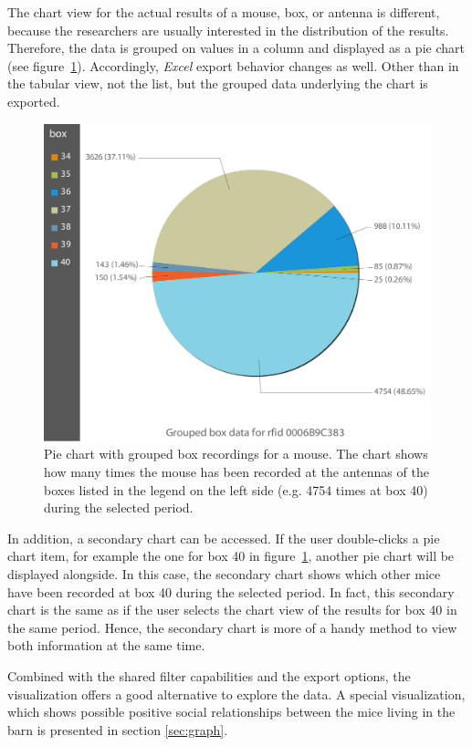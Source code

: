 The chart view for the actual results of a mouse, box, or antenna is different, because the researchers are usually interested in the distribution of the results. Therefore, the data is grouped on values in a column and displayed as a pie chart (see figure~\ref{fig:pie_chart_for_mouse}). Accordingly, \textit{Excel} export behavior changes as well. Other than in the tabular view, not the list, but the grouped data underlying the chart is exported.

\begin{figure}[htbp]
\begin{center}
  \includegraphics[width=.66\textwidth]{assets/img/pie_chart_for_mouse.png}
  \caption[Pie chart of result data for a mouse]{Pie chart with grouped box recordings for a mouse. The chart shows how many times the mouse has been recorded at the antennas of the boxes listed in the legend on the left side (e.g. 4754 times at box 40) during the selected period.}
  \label{fig:pie_chart_for_mouse}
\end{center}
\end{figure}

In addition, a secondary chart can be accessed. If the user double-clicks a pie chart item, for example the one for box 40 in figure~\ref{fig:pie_chart_for_mouse}, another pie chart will be displayed alongside. In this case, the secondary chart shows which other mice have been recorded at box 40 during the selected period. In fact, this secondary chart is the same as if the user selects the chart view of the results for box 40 in the same period. Hence, the secondary chart is more of a handy method to view both information at the same time.

Combined with the shared filter capabilities and the export options, the visualization offers a good alternative to explore the data. A special visualization, which shows possible positive social relationships between the mice living in the barn is presented in section \ref{sec:graph}.

